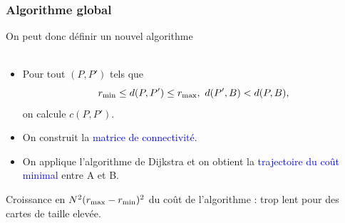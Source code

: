 \documentclass[11pt]{beamer}
\begin{document}
\begin{frame}
\frametitle{Algorithme global}
On peut donc définir un nouvel algorithme\\
~\\
\begin{itemize}
\item Pour tout $(P, P')$ tels que
  \[
  r_{\rm min} \le d(P, P') \le r_{\rm max}, \ d(P', B) < d(P, B),
  \]
  on calcule $c(P,P')$.
\item On construit la \textcolor{blue}{matrice de connectivité}.
\item On applique l'algorithme de Dijkstra et on obtient la \textcolor{blue}{trajectoire du coût minimal} entre A et B.
\end{itemize}

\vfill
 \textcolor{red} {\selectfont{}\relax}
Croissance en $ N^2(r_{\rm max} - r_{\rm min})^2$ du coût de l'algorithme : trop lent pour des cartes de taille elevée.
\end{frame}
\end{document}
